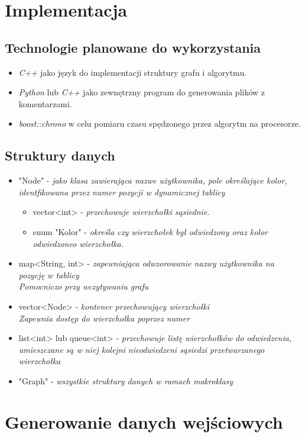 \documentclass[11pt]{article} %
\begin{document}
\section{Implementacja}
\subsection{Technologie planowane do wykorzystania}
\begin{itemize}
\item
\textsl{C++} jako język do implementacji struktury grafu i algorytmu.
\item
\textsl{Python} lub \textsl{C++} jako zewnętrzny program do generowania plików z komentarzami.
\item
\textsl{boost::chrono} w celu pomiaru czasu spędzonego przez algorytm na procesorze. 
\end{itemize}
\subsection{Struktury danych}
\begin{itemize}
\item
"Node" - \textsl{jako klasa zawierająca nazwe użytkownika, pole określające kolor, identfikowana przez numer pozycji w dynamicznej tablicy}
\begin{itemize}[\textsl{W Node} :]
\item
vector<int> - \textsl{przechowuje wierzchołki sąsiednie.}
\item
enum "Kolor" - \textsl{określa czy wierzchołek był odwiedzony oraz kolor odwiedzoneo wierzchołka.}
\end{itemize}
\item
map<String, int> - \textsl{zapewniająca odwzorowanie nazwy użytkownika na pozycję w tablicy} \\ 
\textsl{Pomocniczo przy wczytywaniu grafu}
\item
vector<Node> - \textsl{kontener przechowujący wierzchołki}\\ 
\textsl{Zapewnia dostęp do wierzchołka poprzez numer} 
\item list<int> lub queue<int> - \textsl{przechowuje listę wierzchołków do odwiedzenia, umieszczane są w niej kolejni nieodwiedzeni sąsiedzi przetwarzanego wierzchołka}
\item
"Graph" - \textsl{wszystkie struktury danych w ramach makroklasy} 
\end{itemize}
\section{Generowanie danych wejściowych}
\end{document}
